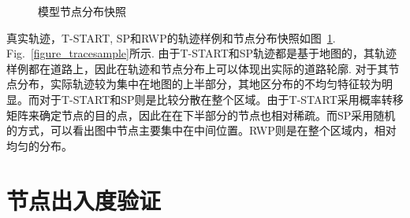 \begin{figure}[h]
\centering
{}
\caption{模型节点分布快照}\label{figure_trace_snapshots}
\end{figure}

真实轨迹，T-START, SP和RWP的轨迹样例和节点分布快照如图~\ref{figure_trace_snapshots}. Fig.~\ref{figure_tracesample}所示. 由于T-START和SP轨迹都是基于地图的，其轨迹样例都在道路上，因此在轨迹和节点分布上可以体现出实际的道路轮廓. 对于其节点分布，实际轨迹较为集中在地图的上半部分，其地区分布的不均匀特征较为明显。而对于T-START和SP则是比较分散在整个区域。由于T-START采用概率转移矩阵来确定节点的目的点，因此在在下半部分的节点也相对稀疏。而SP采用随机的方式，可以看出图中节点主要集中在中间位置。RWP则是在整个区域内，相对均匀的分布。

\section{节点出入度验证}

